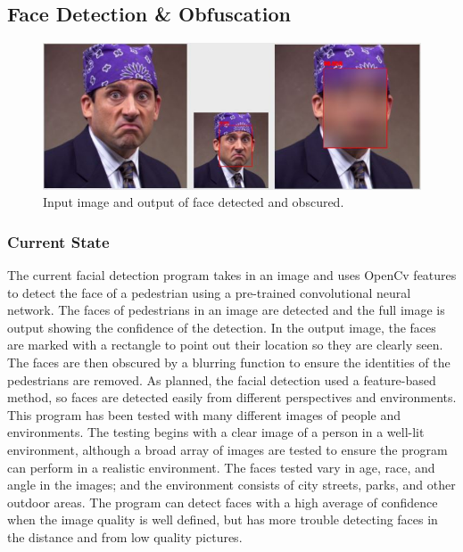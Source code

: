 \documentclass[onecolumn, draftclsnofoot,10pt, compsoc]{IEEEtran}
\begin{document}

\subsection{Face Detection \& Obfuscation}

\begin{figure}[!htb]
\caption{Input image and output of face detected and obscured.}
\centerline{\includegraphics[width=\textwidth]{scott.JPG}}
\label{fig:objdet}
\end{figure}

\subsubsection{Current State}
The current facial detection program takes in an image and uses OpenCv features to detect the face of a pedestrian using a pre-trained convolutional neural network. The faces of pedestrians in an image are detected and the full image is output showing the confidence of the detection. In the output image, the faces are marked with a rectangle to point out their location so they are clearly seen. The faces are then obscured by a blurring function to ensure the identities of the pedestrians are removed. As planned, the facial detection used a feature-based method, so faces are detected easily from different perspectives and environments. This program has been tested with many different images of people and environments. The testing begins with a clear image of a person in a well-lit environment, although a broad array of images are tested to ensure the program can perform in a realistic environment. The faces tested vary in age, race, and angle in the images; and the environment consists of city streets, parks, and other outdoor areas. The program can detect faces with a high average of confidence when the image quality is well defined, but has more trouble detecting faces in the distance and from low quality pictures.
\end{document}
